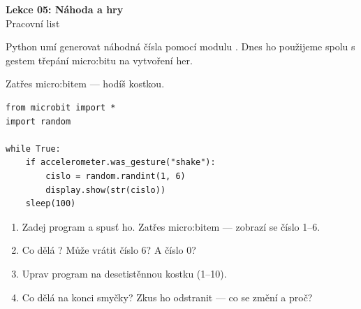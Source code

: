 \newcommand{\lekce}{Lekce 05 -- Pracovní list}




\begin{center}
  {\Large\bfseries\textcolor{microbit-blue}{Lekce 05: Náhoda a hry}}\\[4pt]
  {\large Pracovní list}
\end{center}

\medskip\noindent
Python umí generovat náhodná čísla pomocí modulu .
Dnes ho použijeme spolu s gestem třepání micro:bitu na vytvoření her.

\begin{ukol}

Zatřes micro:bitem — hodíš kostkou.

\begin{lstlisting}
from microbit import *
import random

while True:
    if accelerometer.was_gesture("shake"):
        cislo = random.randint(1, 6)
        display.show(str(cislo))
    sleep(100)
\end{lstlisting}


\begin{enumerate}
  \item Zadej program a spusť ho. Zatřes micro:bitem — zobrazí se číslo 1–6.
  \item Co dělá ?
        Může vrátit číslo 6? A číslo 0?
  \item Uprav program na desetistěnnou kostku (1–10).
  \item Co dělá  na konci smyčky?
        Zkus ho odstranit — co se změní a proč?
\end{enumerate}


\end{ukol}
